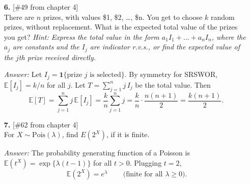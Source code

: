 \documentclass{article}
\begin{document}
\begin{enumerate}
\bigskip

\item[\textbf{6.}] [\#49 from chapter 4]\\
There are $n$ prizes, with values \$1, \$2, \dots, \$n. 
You get to choose $k$ random prizes, without replacement.
What is the expected total value of the prizes you get?
\textit{Hint: Express the total value in the form $a_1 I_1 + \dots + a_n I_n$, where the $a_j$ are constants and the $I_j$ are indicator r.v.s., or find the expected value of the $j$th prize received directly.}

\medskip
\noindent\textit{Answer:}
Let $I_j=\mathbf{1}\{\text{prize $j$ is selected}\}$.
By symmetry for SRSWOR, $\mathbb{E}[I_j]=k/n$ for all $j$.
Let $T=\sum_{j=1}^n j\,I_j$ be the total value. Then
\[
\mathbb{E}[T]=\sum_{j=1}^n j\,\mathbb{E}[I_j]
=\frac{k}{n}\sum_{j=1}^n j
=\frac{k}{n}\cdot \frac{n(n+1)}{2}
=\boxed{\frac{k(n+1)}{2}}.
\]

\bigskip

\item[\textbf{7.}] [\#62 from chapter 4]\\
For $X \sim \text{Pois}(\lambda)$, find $E(2^X)$, if it is finite.

\medskip
\noindent\textit{Answer:}
The probability generating function of a Poisson is $\mathbb{E}(t^X)=\exp\{\lambda(t-1)\}$ for all $t>0$.
Plugging $t=2$,
\[
\boxed{\,\mathbb{E}(2^X)=e^{\lambda}\,}\qquad\text{(finite for all }\lambda\ge 0\text{)}.
\]

\end{enumerate}
\end{document}
